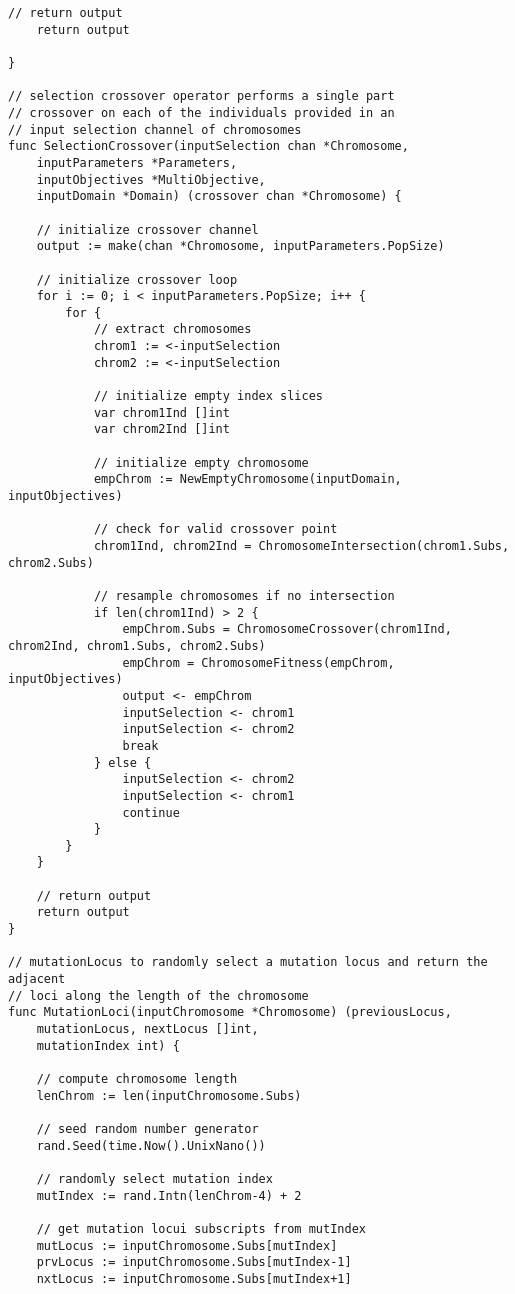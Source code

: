 \begin{lstlisting}[basicstyle=\tiny]
	// return output
	return output

}

// selection crossover operator performs a single part
// crossover on each of the individuals provided in an
// input selection channel of chromosomes
func SelectionCrossover(inputSelection chan *Chromosome, 
    inputParameters *Parameters, 
    inputObjectives *MultiObjective, 
    inputDomain *Domain) (crossover chan *Chromosome) {

	// initialize crossover channel
	output := make(chan *Chromosome, inputParameters.PopSize)

	// initialize crossover loop
	for i := 0; i < inputParameters.PopSize; i++ {
		for {
			// extract chromosomes
			chrom1 := <-inputSelection
			chrom2 := <-inputSelection

			// initialize empty index slices
			var chrom1Ind []int
			var chrom2Ind []int

			// initialize empty chromosome
			empChrom := NewEmptyChromosome(inputDomain, inputObjectives)

			// check for valid crossover point
			chrom1Ind, chrom2Ind = ChromosomeIntersection(chrom1.Subs, chrom2.Subs)

			// resample chromosomes if no intersection
			if len(chrom1Ind) > 2 {
				empChrom.Subs = ChromosomeCrossover(chrom1Ind, chrom2Ind, chrom1.Subs, chrom2.Subs)
				empChrom = ChromosomeFitness(empChrom, inputObjectives)
				output <- empChrom
				inputSelection <- chrom1
				inputSelection <- chrom2
				break
			} else {
				inputSelection <- chrom2
				inputSelection <- chrom1
				continue
			}
		}
	}

	// return output
	return output
}

// mutationLocus to randomly select a mutation locus and return the adjacent
// loci along the length of the chromosome
func MutationLoci(inputChromosome *Chromosome) (previousLocus, 
    mutationLocus, nextLocus []int, 
    mutationIndex int) {

	// compute chromosome length
	lenChrom := len(inputChromosome.Subs)

	// seed random number generator
	rand.Seed(time.Now().UnixNano())

	// randomly select mutation index
	mutIndex := rand.Intn(lenChrom-4) + 2

	// get mutation locui subscripts from mutIndex
	mutLocus := inputChromosome.Subs[mutIndex]
	prvLocus := inputChromosome.Subs[mutIndex-1]
	nxtLocus := inputChromosome.Subs[mutIndex+1]


\end{lstlisting}
